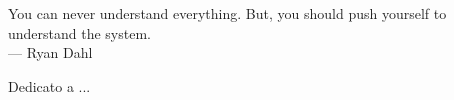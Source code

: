 
\cleardoublepage
{}
\thispagestyle{empty}

\vspace*{3cm}

\begin{center}
You can never understand everything. 
But, you should push yourself to understand the system. \\ \medskip
--- Ryan Dahl 
\end{center}

\medskip

\begin{center}
Dedicato a ...
\end{center}
